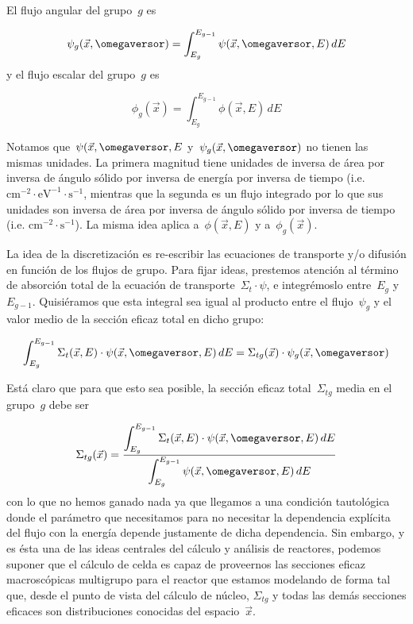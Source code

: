 \begin{definicion}\label{def:flujogrupo}
El flujo angular del grupo~$g$ es

\begin{equation}
 \psi_g(\vec{x}, \omegaversor) = \int_{E_g}^{E_{g-1}} \psi(\vec{x}, \omegaversor, E) \, dE
\end{equation}
%
y el flujo escalar del grupo~$g$ es

\begin{equation}
 \phi_g(\vec{x}) = \int_{E_g}^{E_{g-1}} \phi(\vec{x}, E) \, dE
\end{equation}

Notamos que~$\psi(\vec{x}, \omegaversor, E$ y~$\psi_g(\vec{x}, \omegaversor)$ no tienen las mismas unidades. La primera magnitud tiene unidades de inversa de área por inversa de ángulo sólido por inversa de energía por inversa de tiempo (i.e. $\text{cm}^{-2} \cdot \text{eV}^{-1} \cdot \text{s}^{-1}$, mientras que la segunda es un flujo integrado por lo que sus unidades son inversa de área por inversa de ángulo sólido por inversa de tiempo (i.e. $\text{cm}^{-2} \cdot \text{s}^{-1}$). La misma idea aplica a~$\phi(\vec{x}, E)$ y a~$\phi_g(\vec{x})$.
\end{definicion}

La idea de la discretización es re-escribir las ecuaciones de transporte y/o difusión en función de los flujos de grupo. Para fijar ideas, prestemos atención al término de absorción total de la ecuación de transporte~$\Sigma_t \cdot \psi$, e integrémoslo entre~$E_g$ y~$E_{g-1}$. Quisiéramos que esta integral sea igual al producto entre el flujo~$\psi_g$ y el valor medio de la sección eficaz total en dicho grupo:

\begin{equation*}
\int_{E_g}^{E_{g-1}} \Sigma_t(\vec{x}, E) \cdot \psi(\vec{x}, \omegaversor, E) \, dE =
\Sigma_{t g}(\vec{x}) \cdot \psi_g(\vec{x}, \omegaversor)
\end{equation*}

Está claro que para que esto sea posible, la sección eficaz total~$\Sigma_{t g}$ media en el grupo~$g$ debe ser

\begin{equation}\label{eq:sigmatg}
\Sigma_{t g}(\vec{x}) = \frac{\displaystyle \int_{E_g}^{E_{g-1}} \Sigma_t(\vec{x}, E) \cdot \psi(\vec{x}, \omegaversor, E) \, dE}{\displaystyle \int_{E_g}^{E_{g-1}} \psi(\vec{x}, \omegaversor, E) \, dE}
\end{equation}
%
con lo que no hemos ganado nada ya que llegamos a una condición tautológica donde el parámetro que necesitamos para no necesitar la dependencia explícita del flujo con la energía depende justamente de dicha dependencia. Sin embargo, y es ésta una de las ideas centrales del cálculo y análisis de reactores, podemos suponer que el cálculo de celda es capaz de proveernos las secciones eficaz macroscópicas multigrupo para el reactor que estamos modelando de forma tal que, desde el punto de vista del cálculo de núcleo, $\Sigma_{t g}$ y todas las demás secciones eficaces son distribuciones conocidas del espacio~$\vec{x}$.

